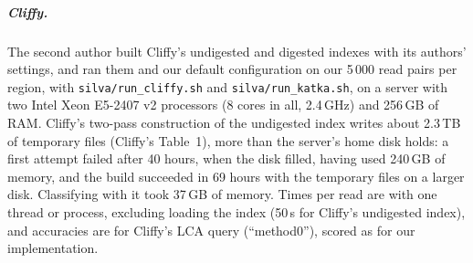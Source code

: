 \subparagraph*{Cliffy.}
The second author built Cliffy's undigested and digested indexes with its authors' settings, and ran them and our default configuration on our 5\,000 read pairs per region, with \texttt{silva/run\_cliffy.sh} and \texttt{silva/run\_katka.sh}, on a server with two Intel Xeon E5-2407 v2 processors (8 cores in all, 2.4\,GHz) and 256\,GB of RAM.
Cliffy's two-pass construction of the undigested index writes about 2.3\,TB of temporary files (Cliffy's Table~1), more than the server's home disk holds: a first attempt failed after 40 hours, when the disk filled, having used 240\,GB of memory, and the build succeeded in 69 hours with the temporary files on a larger disk.
Classifying with it took 37\,GB of memory.
Times per read are with one thread or process, excluding loading the index (50\,s for Cliffy's undigested index), and accuracies are for Cliffy's LCA query (``method0''), scored as for our implementation.

